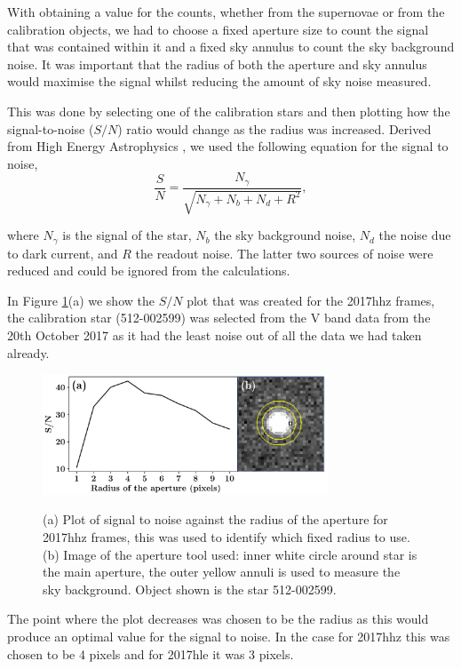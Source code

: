 \documentclass[twocolumn]{revtex4}
\begin{document}
With obtaining a value for the counts, whether from the supernovae or from the calibration objects, we had to choose a fixed aperture size to count the signal that was contained within it and a fixed sky annulus to count the sky background noise. It was important that the radius of both the aperture and sky annulus would maximise the signal whilst reducing the amount of sky noise measured.

This was done by selecting one of the calibration stars and then plotting how the signal-to-noise ($S/N$) ratio would change as the radius was increased. Derived from High Energy Astrophysics \cite{longair}, we used the following equation for the signal to noise,
\begin{equation}
\frac{S}{N} = \frac{N_{\gamma}}{\sqrt{N_{\gamma}+N_{b}+N_{d}+R^2}},
\end{equation}

where $N_{\gamma}$ is the signal of the star, $N_{b}$ the sky background noise, $N_{d}$ the noise due to dark current, and $R$ the readout noise. The latter two sources of noise were reduced and could be ignored from the calculations.

In Figure \ref{fig:2017_stn}(a) we show the $S/N$ plot that was created for the 2017hhz frames, the calibration star (512-002599) was selected from the V band data from the 20th October 2017 as it had the least noise out of all the data we had taken already.
\begin{figure}[!h]
\begin{center}
\includegraphics[width=8.5cm]{observations/2017hhz}
\caption[]{(a) Plot of signal to noise against the radius of the aperture for 2017hhz frames, this was used to identify which fixed radius to use. (b) Image of the aperture tool used: inner white circle around star is the main aperture, the outer yellow annuli is used to measure the sky background. Object shown is the star 512-002599.}
\vspace{-5ex}
\label{fig:2017_stn}
\end{center}
\end{figure}

The point where the plot decreases was chosen to be the radius as this would produce an optimal value for the signal to noise. In the case for 2017hhz this was chosen to be 4 pixels and for 2017hle it was 3 pixels. 
\end{document}
